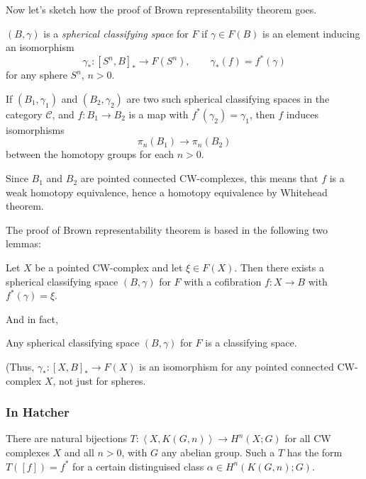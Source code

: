 Now let's sketch how the proof of Brown
representability theorem goes.

\begin{definition}
\label{definition-b-spher-class-space-f}
	$(B,\gamma)$ is a {\it spherical classifying
	space} for $F$ if $\gamma\in F(B)$ is an
	element inducing an isomorphism
	$$\gamma_{*}:[S^{n},B]_{*}\to
	F(S^{n}),\qquad \gamma_{*}(f)=f^{*}
	(\gamma)$$
	for any sphere $S^{n}$, $n>0$.
\end{definition}

\begin{remark}
\label{remark-if-b-1-1-b-2-2-two-such-sphe}
	If $(B_{1},\gamma_{1})$ and
	$(B_{2},\gamma_{2})$ are two such spherical
	classifying spaces in the category
	$\mathcal{C}$, and $f:B_{1}\to B_{2}$ is a
	map with $f^{*} (\gamma_{2})=\gamma_{1}$,
	then $f$ induces isomorphisms
	$$\pi_{n}(B_{1})\to \pi_{n}(B_{2})$$
	between the homotopy groups for each $n>0$.

	Since $B_{1}$ and $B_{2}$ are pointed
	connected CW-complexes, this means that $f$
	is a weak homotopy equivalence, hence a
	homotopy equivalence by Whitehead theorem.
\end{remark}

The proof of Brown representability theorem
is based in the following two lemmas:

\begin{lemma}
\label{lemma-let-x-be-point-cw-compl-let}
	Let $X$ be a pointed CW-complex and let $\xi
	\in F(X)$. Then there exists a spherical
	classifying space $(B,\gamma)$ for $F$ with
	a cofibration  $f:X\to B$ with $f^{*}
	(\gamma)=\xi$.
\end{lemma}

And in fact,

\begin{lemma}
\label{lemma-any-spher-class-space-b-f}
	Any spherical classifying space $(B,\gamma)$
	for $F$ is a classifying space.

	(Thus, $\gamma_{*}:[X,B]_{*}\to F(X)$ is an
	isomorphism for any pointed connected
	CW-complex $X$, not just for spheres.
\end{lemma}

\subsubsection{In Hatcher}
\label{subsection-in-hatcher}

\begin{theorem}[4.57]
\label{theorem-4-57}
	There are natural bijections
	$T:\left\langle{}X,K(G,n) \right\rangle{} \to H^{n}(X;G)$
	for all CW complexes $X$ and all $n>0$, with
	$G$ any abelian group. Such a $T$ has the
	form $T([f])=f^{*}$ for a certain
	distinguised class $\alpha\in
	H^{n}(K(G,n);G)$.
\end{theorem}

